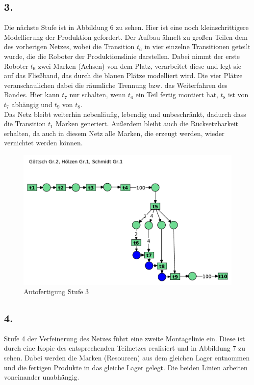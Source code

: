 \documentclass[12pt, paper=a4]{article}
\begin{document}
\subsection*{3.}
Die nächste Stufe ist in Abbildung 6 zu sehen. Hier ist eine noch kleinschrittigere Modellierung der Produktion gefordert. Der Aufbau ähnelt zu großen Teilen dem des vorherigen Netzes, wobei die Transition $t_6$ in vier einzelne Transitionen geteilt wurde, die die Roboter der Produktionslinie darstellen. Dabei nimmt der erste Roboter $t_6$ zwei Marken (Achsen) von dem Platz, verarbeitet diese und legt sie auf das Fließband, das durch die blauen Plätze modelliert wird. Die vier Plätze veranschaulichen dabei die räumliche Trennung bzw. das Weiterfahren des Bandes. Hier kann $t_7$ nur schalten, wenn $t_6$ ein Teil fertig montiert hat, $t_8$ ist von $t_7$ abhängig und $t_9$ von $t_8$.\\

Das Netz bleibt weiterhin nebenläufig, lebendig und unbeschränkt, dadurch dass die Transition $t_1$ Marken generiert. Außerdem bleibt auch die Rücksetzbarkeit erhalten, da auch in diesem Netz alle Marken, die erzeugt werden, wieder vernichtet werden können.\\

\begin{figure}[h!]
\centering
\includegraphics[scale=0.7]{7-5-3.pdf}
\caption{Autofertigung Stufe 3}
\end{figure}

\newpage
\subsection*{4.}
Stufe 4 der Verfeinerung des Netzes führt eine zweite Montagelinie ein. Diese ist durch eine Kopie des entsprechenden Teilnetzes realisiert und in Abbildung 7 zu sehen. Dabei werden die Marken (Resourcen) aus dem gleichen Lager entnommen und die fertigen Produkte in das gleiche Lager gelegt. Die beiden Linien arbeiten voneinander unabhängig.\\
\end{document}

